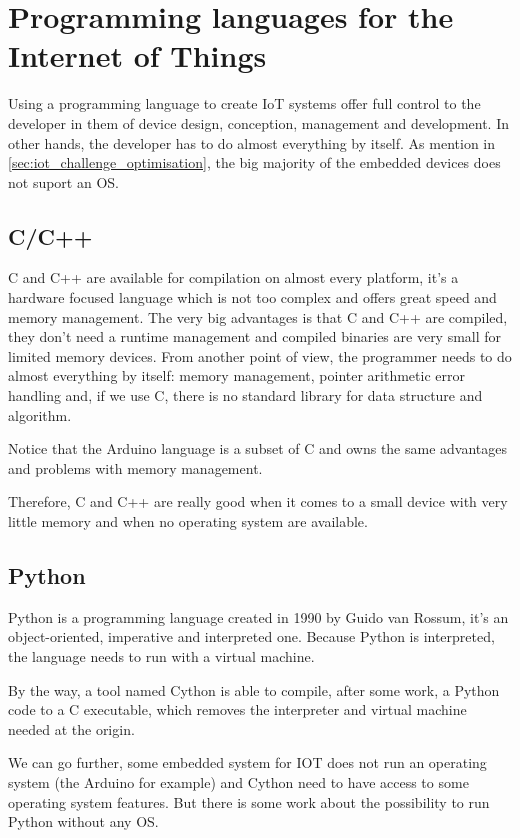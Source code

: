 \section{Programming languages for the Internet of Things}
\label{sec:pl_for_iot}

Using a programming language to create \gls{IoT} systems offer full control to
the developer in them of device design, conception, management and development.
In other hands, the developer has to do almost everything by itself. As mention
in \ref{sec:iot_challenge_optimisation}, the big majority of the embedded
devices does not suport an \gls{OS}.

\subsection{C/C++}
\label{subsec:cc++}

C and C++ are available for compilation on almost every platform, it’s a
hardware focused language which is not too complex and offers great speed and
memory management. The very big advantages is that C and C++ are compiled, they
don’t need a runtime management and compiled binaries are very small for limited
memory devices. From another point of view, the programmer needs to do almost
everything by itself: memory management, pointer arithmetic error handling
and, if we use C, there is no standard library for data structure and algorithm.

Notice that the Arduino language is a subset of C and owns the same advantages
and problems with memory management.

Therefore, C and C++ are really good when it comes to a small device with very
little memory and when no operating system are available.

\subsection{Python}
\label{subsec:python}

Python is a programming language created in 1990 by Guido van Rossum, it’s an
object-oriented, imperative and interpreted one. Because Python is interpreted,
the language needs to run with a virtual machine.

By the way, a tool named Cython\cite{behnel2010cython} is able to compile, after
some work, a Python code to a C executable, which removes the interpreter and
virtual machine needed at the origin.

We can go further, some embedded system for IOT does not run an operating system
(the Arduino for example) and Cython need to have access to some operating
system features. But there is some work about the possibility to run Python
without any OS\cite{jakeedge2015}.

